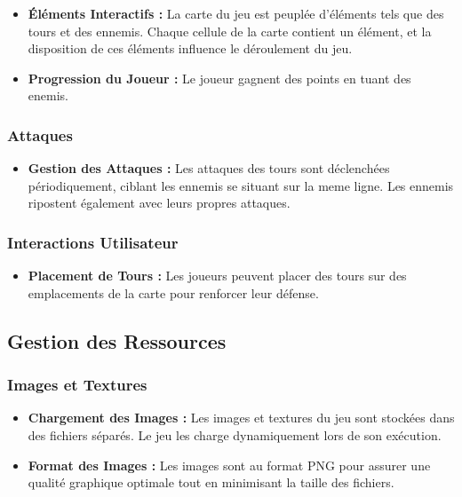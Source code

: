 \documentclass{article}
\begin{document}
\begin{itemize}
    \item \textbf{Éléments Interactifs :} La carte du jeu est peuplée d'éléments tels que des tours et des ennemis. Chaque cellule de la carte contient un élément, et la disposition de ces éléments influence le déroulement du jeu.

    \item \textbf{Progression du Joueur :} Le joueur gagnent des points en tuant des enemis.
\end{itemize}

\subsubsection*{Attaques}

\begin{itemize}
    \item \textbf{Gestion des Attaques :} Les attaques des tours sont déclenchées périodiquement, ciblant les ennemis se situant sur la meme ligne. Les ennemis ripostent également avec leurs propres attaques.
\end{itemize}

\subsubsection*{Interactions Utilisateur}

\begin{itemize}
    \item \textbf{Placement de Tours :} Les joueurs peuvent placer des tours sur des emplacements de la carte pour renforcer leur défense.
\end{itemize}

\subsection*{Gestion des Ressources}

\subsubsection*{Images et Textures}

\begin{itemize}
    \item \textbf{Chargement des Images :} Les images et textures du jeu sont stockées dans des fichiers séparés. Le jeu les charge dynamiquement lors de son exécution.

    \item \textbf{Format des Images :} Les images sont au format PNG pour assurer une qualité graphique optimale tout en minimisant la taille des fichiers.
\end{itemize}
\end{document}
